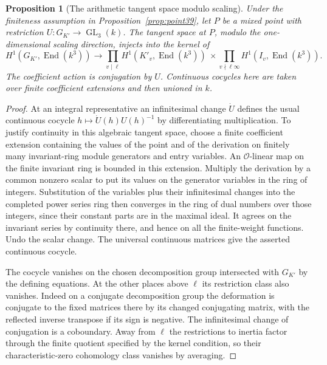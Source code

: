 \documentclass[a4paper,11pt]{article}
\newtheorem{proposition}{Proposition}[section]
\theoremstyle{definition}
\theoremstyle{remark}
\numberwithin{equation}{section}
\newcommand{\GL}{\operatorname{GL}}
\newcommand{\OO}{\mathcal O}
\begin{document}
\begin{proposition}[The arithmetic tangent space modulo scaling]\label{prop:tangent39}
Under the finiteness assumption in Proposition~\ref{prop:point39}, let \(P\) be a mixed point with restriction \(U:G_{K'}\to\GL_3(k)\). The tangent space at \(P\), modulo the one-dimensional scaling direction, injects into the kernel of
\[
 H^1(G_{K'},\operatorname{End}(k^3))\longrightarrow
 \prod_{v\mid\ell}H^1(K'_v,\operatorname{End}(k^3))\ \times
 \prod_{v\nmid\ell\infty}H^1(I_v,\operatorname{End}(k^3)).
\]
The coefficient action is conjugation by \(U\). Continuous cocycles here are taken over finite coefficient extensions and then unioned in \(k\).
\end{proposition}
\begin{proof}
At an integral representative an infinitesimal change \(\dot U\) defines the usual continuous cocycle \(h\mapsto\dot U(h)U(h)^{-1}\) by differentiating multiplication. To justify continuity in this algebraic tangent space, choose a finite coefficient extension containing the values of the point and of the derivation on finitely many invariant-ring module generators and entry variables. An \(\OO\)-linear map on the finite invariant ring is bounded in this extension. Multiply the derivation by a common nonzero scalar to put its values on the generator variables in the ring of integers. Substitution of the variables plus their infinitesimal changes into the completed power series ring then converges in the ring of dual numbers over those integers, since their constant parts are in the maximal ideal. It agrees on the invariant series by continuity there, and hence on all the finite-weight functions. Undo the scalar change. The universal continuous matrices give the asserted continuous cocycle.

The cocycle vanishes on the chosen decomposition group intersected with \(G_{K'}\) by the defining equations. At the other places above \(\ell\) its restriction class also vanishes. Indeed on a conjugate decomposition group the deformation is conjugate to the fixed matrices there by its changed conjugating matrix, with the reflected inverse transpose if its sign is negative. The infinitesimal change of conjugation is a coboundary. Away from \(\ell\) the restrictions to inertia factor through the finite quotient specified by the kernel condition, so their characteristic-zero cohomology class vanishes by averaging.


\end{proof}
\end{document}
